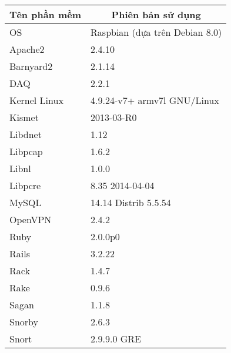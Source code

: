 \begin{table}[H]
\centering
\small
\setlength{\extrarowheight}{1pt}
\begin{tabular}{|p{3.5cm}|p{9cm}|}
\hline
\multicolumn{1}{|c|}{\textbf{Tên phần mềm}} & \multicolumn{1}{c|}{\textbf{Phiên bản sử dụng}} \\ \hline
OS                                          & Raspbian (dựa trên Debian 8.0)                  \\ \hline
Apache2                                     & 2.4.10                                          \\ \hline
Barnyard2                                   & 2.1.14                                          \\ \hline
DAQ                                         & 2.2.1                                           \\ \hline
Kernel Linux                                & 4.9.24-v7+ armv7l GNU/Linux                     \\ \hline
Kismet                                      & 2013-03-R0                               \\ \hline
Libdnet                                     & 1.12                                            \\ \hline
Libpcap                                     & 1.6.2                                           \\ \hline
Libnl                                       & 1.0.0                                           \\ \hline
Libpcre                                     & 8.35 2014-04-04                                 \\ \hline
MySQL                                       & 14.14 Distrib 5.5.54                            \\ \hline
OpenVPN                                     & 2.4.2                                           \\ \hline
Ruby                                        & 2.0.0p0                                         \\ \hline
Rails                                       & 3.2.22                                          \\ \hline
Rack                                        & 1.4.7                                           \\ \hline
Rake                                        & 0.9.6                                           \\ \hline
Sagan                                       & 1.1.8                                           \\ \hline
Snorby                                      & 2.6.3                                           \\ \hline
Snort                                       & 2.9.9.0 GRE                                     \\ \hline
\end{tabular}
\end{table}

